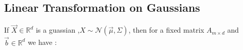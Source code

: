 \subsection{Linear Transformation on Gaussians}

If $\vec{X} \in \mathbb{R}^d$ is a guassian ,$X \sim \mathcal{N}(\vec{\mu},\Sigma)$, then for a fixed matrix $A_{m\times d}$ and $\vec{b}\in\mathbb{R}^d$ we have :

